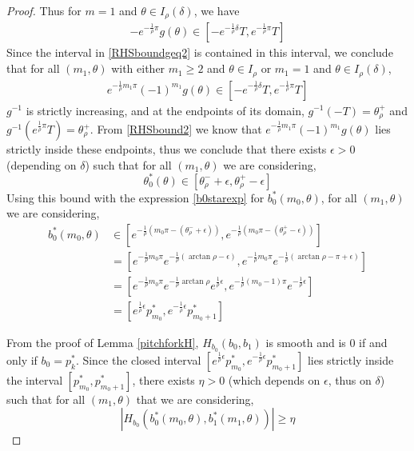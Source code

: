 \documentclass[thesis.tex]{subfiles}
\begin{document}
\begin{lemma}
\begin{proof}
Thus for $m = 1$ and $\theta \in I_\rho(\delta)$, we have
\begin{align*}
-e^{ -\frac{1}{\rho} \pi } g(\theta)
\in [-e^{-\frac{1}{\rho}\delta} T, e^{ -\frac{1}{\rho} \pi } T]
\end{align*}
Since the interval in \eqref{RHSboundgeq2} is contained in this interval, we conclude that for all $(m_1, \theta)$ with either $m_1 \geq 2$ and $\theta \in I_\rho$ or $m_1 = 1$ and $\theta \in I_\rho(\delta)$,
\begin{align}\label{RHSbound2}
e^{ -\frac{1}{\rho} m_1 \pi } (-1)^{m_1} g(\theta) \in [-e^{-\frac{1}{\rho}\delta} T, e^{ -\frac{1}{\rho} \pi } T]
\end{align}
$g^{-1}$ is strictly increasing, and at the endpoints of its domain, $g^{-1}(-T) = \theta_\rho^+$ and $g^{-1}(e^{\frac{1}{\rho}\pi}T) = \theta_\rho^+$. From \eqref{RHSbound2} we know that $e^{ -\frac{1}{\rho} m_1 \pi } (-1)^{m_1} g(\theta)$ lies strictly inside these endpoints, thus we conclude that there exists $\epsilon > 0$ (depending on $\delta$) such that for all $(m_1, \theta)$ we are considering,
\begin{equation}\label{thetastarboundeps}
\theta_0^*(\theta) \in [\theta_\rho^- + \epsilon, \theta_\rho^+ - \epsilon]
\end{equation}
Using this bound with the expression \eqref{b0starexp} for $b_0^*(m_0, \theta)$, for all $(m_1, \theta)$ we are considering,
\begin{align*}
b_0^*(m_0, \theta) 
&\in \left[e^{-\frac{1}{\rho}(m_0 \pi - (\theta_\rho^- + \epsilon)) }, e^{-\frac{1}{\rho}(m_0 \pi - (\theta_\rho^+ - \epsilon)) }\right] \\
&= \left[ e^{-\frac{1}{\rho} m_0 \pi} e^{-\frac{1}{\rho} (\arctan \rho - \epsilon)}, e^{-\frac{1}{\rho} m_0 \pi} e^{-\frac{1}{\rho} (\arctan \rho - \pi + \epsilon)}\right] \\
&= \left[ e^{-\frac{1}{\rho} m_0 \pi} e^{-\frac{1}{\rho} \arctan \rho} e^{\frac{1}{\rho}\epsilon}, e^{-\frac{1}{\rho} (m_0-1) \pi} e^{-\frac{1}{\rho} \epsilon}\right] \\
&= \left[ e^{\frac{1}{\rho}\epsilon} p_{m_0}^*, e^{-\frac{1}{\rho} \epsilon} p_{m_0 + 1}^* \right]
\end{align*}

From the proof of Lemma \ref{pitchforkH}, $H_{b_0}(b_0, b_1)$ is smooth and is 0 if and only if $b_0 = p_k^*$. Since the closed interval $\left[ e^{\frac{1}{\rho}\epsilon} p_{m_0}^*, e^{-\frac{1}{\rho} \epsilon} p_{m_0 + 1}^* \right]$ lies strictly inside the interval $[p_{m_0}^*, p_{m_0+1}^*]$, there exists $\eta > 0$ (which depends on $\epsilon$, thus on $\delta$) such that for all $(m_1, \theta)$ that we are considering, 
\[
|H_{b_0} (b_0^*(m_0, \theta), b_1^*(m_1, \theta))| \geq \eta
\]
\end{proof}
\end{lemma}
\end{document}

